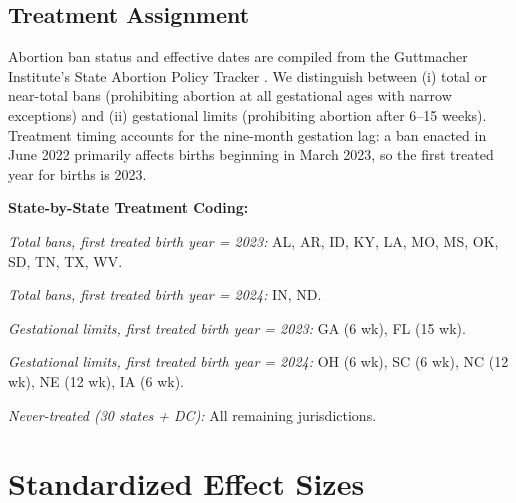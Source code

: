 \documentclass[12pt]{article}
\begin{document}
\subsection{Treatment Assignment}

Abortion ban status and effective dates are compiled from the Guttmacher Institute's State Abortion Policy Tracker \citep{guttmacher2024policy}. We distinguish between (i) total or near-total bans (prohibiting abortion at all gestational ages with narrow exceptions) and (ii) gestational limits (prohibiting abortion after 6--15 weeks). Treatment timing accounts for the nine-month gestation lag: a ban enacted in June 2022 primarily affects births beginning in March 2023, so the first treated year for births is 2023.

\medskip
\noindent\textbf{State-by-State Treatment Coding:}

\smallskip
\noindent\textit{Total bans, first treated birth year = 2023:} AL, AR, ID, KY, LA, MO, MS, OK, SD, TN, TX, WV.

\smallskip
\noindent\textit{Total bans, first treated birth year = 2024:} IN, ND.

\smallskip
\noindent\textit{Gestational limits, first treated birth year = 2023:} GA (6 wk), FL (15 wk).

\smallskip
\noindent\textit{Gestational limits, first treated birth year = 2024:} OH (6 wk), SC (6 wk), NC (12 wk), NE (12 wk), IA (6 wk).

\smallskip
\noindent\textit{Never-treated (30 states + DC):} All remaining jurisdictions.

\section{Standardized Effect Sizes}
\label{sec:sde}


\end{document}
